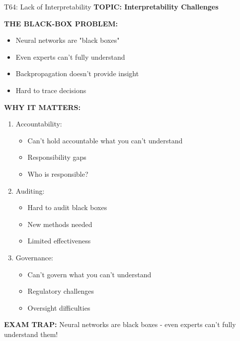 \documentclass[8pt]{beamer}
\begin{document}
	\begin{frame}{T64: Lack of Interpretability}
		\fontsize{6.5}{7.5}\selectfont
		\textbf{TOPIC: Interpretability Challenges}
		
		\vspace{0.1cm}
		\textbf{THE BLACK-BOX PROBLEM:}
		\begin{itemize}
			\item Neural networks are "black boxes"
			\item Even experts can't fully understand
			\item Backpropagation doesn't provide insight
			\item Hard to trace decisions
		\end{itemize}
		
		\vspace{0.1cm}
		\textbf{WHY IT MATTERS:}
		\begin{enumerate}
			\item \textcolor{myblue}{Accountability:}
			\begin{itemize}
				\item Can't hold accountable what you can't understand
				\item Responsibility gaps
				\item Who is responsible?
			\end{itemize}
			\item \textcolor{myblue}{Auditing:}
			\begin{itemize}
				\item Hard to audit black boxes
				\item New methods needed
				\item Limited effectiveness
			\end{itemize}
			\item \textcolor{myblue}{Governance:}
			\begin{itemize}
				\item Can't govern what you can't understand
				\item Regulatory challenges
				\item Oversight difficulties
			\end{itemize}
		\end{enumerate}
		
		\textcolor{myred}{\textbf{EXAM TRAP:}} Neural networks are \textcolor{myblue}{black boxes} - even experts can't fully understand them!
	\end{frame}
	
\end{document}
